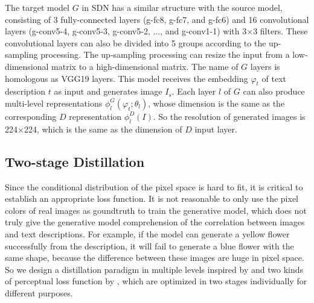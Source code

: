 \documentclass[sigconf]{acmart}
\begin{document}
The target model $G$ in SDN has a similar structure with the source model, consisting of 3 fully-connected layers (g-fc8, g-fc7, and g-fc6) and 16 convolutional layers (g-conv5-4, g-conv5-3, g-conv5-2, ..., and g-conv1-1) with 3$\times$3 filters. These convolutional layers can also be divided into 5 groups according to the up-sampling processing. The up-sampling processing can resize the input from a low-dimensional matrix to a high-dimensional matrix. The name of $G$ layers is homologous as VGG19 layers. This model receives the embedding $\varphi_t$ of text description $t$ as input and generates image $I_s$. Each layer $l$ of $G$ can also produce multi-level representations $\phi_l^G(\varphi_t;\theta_l)$, whose dimension is the same as the corresponding $D$ representation $\phi_l^D(I)$. So the resolution of generated images is 224$\times$224, which is the same as the dimension of $D$ input layer. %

\subsection{Two-stage Distillation}

Since the conditional distribution of the pixel space is hard to fit, it is critical to establish an appropriate loss function. It is not reasonable to only use the pixel colors of real images as goundtruth to train the generative model, which does not truly give the generative model comprehension of the correlation between images and text descriptions. For example, if the model can generate a yellow flower successfully from the description, it will fail to generate a blue flower with the same shape, because the difference between these images are huge in pixel space. So we design a distillation paradigm in multiple levels inspired by \cite{gupta2016cross} and two kinds of perceptual loss function by \cite{chen2017photographic}, which are optimized in two stages individually for different purposes.
\end{document}

